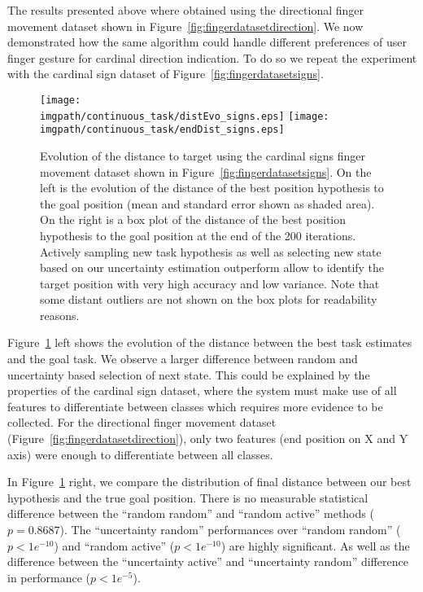 The results presented above where obtained using the directional finger movement dataset shown in Figure~\ref{fig:fingerdatasetdirection}. We now demonstrated how the same algorithm could handle different preferences of user finger gesture for cardinal direction indication. To do so we repeat the experiment with the cardinal sign dataset of Figure~\ref{fig:fingerdatasetsigns}.

\begin{figure}[!ht]
\centering
\texttt{[image: \\imgpath/continuous\_task/distEvo\_signs.eps]}
\texttt{[image: \\imgpath/continuous\_task/endDist\_signs.eps]}
\caption{Evolution of the distance to target using the cardinal signs finger movement dataset shown in Figure~\ref{fig:fingerdatasetsigns}. On the left is the evolution of the distance of the best position hypothesis to the goal position (mean and standard error shown as shaded area). On the right is a box plot of the distance of the best position hypothesis to the goal position at the end of the 200 iterations. Actively sampling new task hypothesis as well as selecting new state based on our uncertainty estimation outperform allow to identify the target position with very high accuracy and low variance. Note that some distant outliers are not shown on the box plots for readability reasons.}
\label{fig:continuoustaskdistevolution_signs}
\end{figure}

Figure~\ref{fig:continuoustaskdistevolution_signs} left shows the evolution of the distance between the best task estimates and the goal task. We observe a larger difference between random and uncertainty based selection of next state. This could be explained by the properties of the cardinal sign dataset, where the system must make use of all features to differentiate between classes which requires more evidence to be collected. For the directional finger movement dataset (Figure~\ref{fig:fingerdatasetdirection}), only two features (end position on X and Y axis) were enough to differentiate between all classes.

In Figure~\ref{fig:continuoustaskdistevolution_signs} right, we compare the distribution of final distance between our best hypothesis and the true goal position. There is no measurable statistical difference between the ``random random'' and ``random active'' methods ($p = 0.8687$). The ``uncertainty random'' performances over ``random random'' ($p<1e^{-10}$) and ``random active'' ($p<1e^{-10}$) are highly significant. As well as the difference between the ``uncertainty active'' and ``uncertainty random'' difference in performance ($p<1e^{-5}$).

